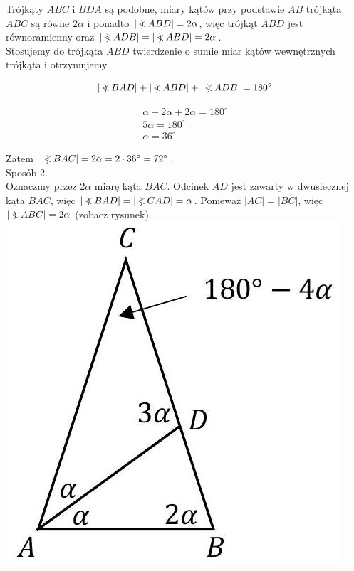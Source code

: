 \documentclass[10pt]{article}
\newcommand\Varangle{\mathop{{<\!\!\!\!\!\text{\small)}}\:}\nolimits}
\begin{document}
Trójkąty $A B C$ i $B D A$ są podobne, miary kątów przy podstawie $A B$ trójkąta $A B C$ są równe $2 \alpha$ i ponadto $|\Varangle A B D|=2 \alpha$, więc trójkąt $A B D$ jest równoramienny oraz $|\Varangle A D B|=|\Varangle A B D|=2 \alpha$.\\
Stosujemy do trójkąta $A B D$ twierdzenie o sumie miar kątów wewnętrznych trójkąta i otrzymujemy

$$
|\Varangle B A D|+|\Varangle A B D|+|\Varangle A D B|=180^{\circ}
$$

$$
\begin{gathered}
\alpha+2 \alpha+2 \alpha=180^{\circ} \\
5 \alpha=180^{\circ} \\
\alpha=36^{\circ}
\end{gathered}
$$

Zatem $|\Varangle B A C|=2 \alpha=2 \cdot 36^{\circ}=72^{\circ}$.\\
Sposób 2.\\
Oznaczmy przez $2 \alpha$ miarę kąta $B A C$. Odcinek $A D$ jest zawarty w dwusiecznej kąta $B A C$, więc $|\Varangle B A D|=|\Varangle C A D|=\alpha$. Ponieważ $|A C|=|B C|$, więc $|\Varangle A B C|=2 \alpha$ (zobacz rysunek).\\
\includegraphics[max width=\textwidth, center]{2025_02_07_191ba7668814b12476d0g-22}
\end{document}
